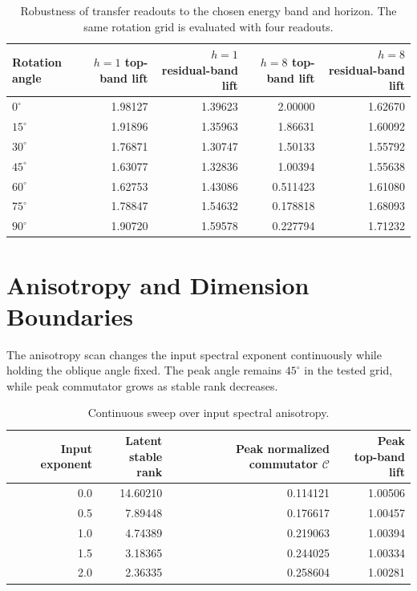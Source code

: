 \documentclass{article}
\begin{document}
\begin{table}[H]
\centering
\setlength{\tabcolsep}{3pt}
\caption{Robustness of transfer readouts to the chosen energy band and horizon. The same rotation grid is evaluated with four readouts.}
\label{tab:supp-metric}
\begin{tabular*}{\linewidth}{@{\extracolsep{\fill}}lrrrr@{}}
\toprule
Rotation angle & \shortstack{$h=1$\\top-band lift} & \shortstack{$h=1$\\residual-band lift} & \shortstack{$h=8$\\top-band lift} & \shortstack{$h=8$\\residual-band lift} \\
\midrule
$0^\circ$ & 1.98127 & 1.39623 & 2.00000 & 1.62670 \\
$15^\circ$ & 1.91896 & 1.35963 & 1.86631 & 1.60092 \\
$30^\circ$ & 1.76871 & 1.30747 & 1.50133 & 1.55792 \\
$45^\circ$ & 1.63077 & 1.32836 & 1.00394 & 1.55638 \\
$60^\circ$ & 1.62753 & 1.43086 & 0.511423 & 1.61080 \\
$75^\circ$ & 1.78847 & 1.54632 & 0.178818 & 1.68093 \\
$90^\circ$ & 1.90720 & 1.59578 & 0.227794 & 1.71232 \\
\bottomrule
\end{tabular*}
\end{table}

\section{Anisotropy and Dimension Boundaries}
\label{sec:supp-boundary}

The anisotropy scan changes the input spectral exponent continuously while holding the oblique angle fixed. The peak angle remains $45^\circ$ in the tested grid, while peak commutator grows as stable rank decreases.

\begin{table}[H]
\centering
\caption{Continuous sweep over input spectral anisotropy.}
\label{tab:supp-anisotropy}
\begin{tabular*}{0.84\linewidth}{@{\extracolsep{\fill}}rrrr@{}}
\toprule
Input exponent & \shortstack{Latent\\stable rank} & \shortstack{Peak normalized\\commutator $\mathcal C$} & \shortstack{Peak\\top-band lift} \\
\midrule
0.0 & 14.60210 & 0.114121 & 1.00506 \\
0.5 & 7.89448 & 0.176617 & 1.00457 \\
1.0 & 4.74389 & 0.219063 & 1.00394 \\
1.5 & 3.18365 & 0.244025 & 1.00334 \\
2.0 & 2.36335 & 0.258604 & 1.00281 \\
\bottomrule
\end{tabular*}
\end{table}
\end{document}

